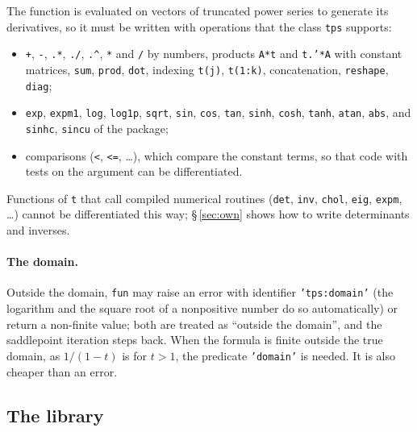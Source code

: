 \documentclass[11pt]{article}
\newcommand{\prog}[1]{\texttt{#1}}
\begin{document}
The function is evaluated on vectors of truncated power series to generate its derivatives, so it
must be written with operations that the class \prog{tps} supports:
\begin{itemize}
\item \prog{+}, \prog{-}, \prog{.*}, \prog{./}, \prog{.\^{}}, \prog{*} and \prog{/} by numbers,
products \prog{A*t} and \prog{t.'*A} with constant matrices, \prog{sum}, \prog{prod}, \prog{dot},
indexing \prog{t(j)}, \prog{t(1:k)}, concatenation, \prog{reshape}, \prog{diag};
\item \prog{exp}, \prog{expm1}, \prog{log}, \prog{log1p}, \prog{sqrt}, \prog{sin}, \prog{cos},
\prog{tan}, \prog{sinh}, \prog{cosh}, \prog{tanh}, \prog{atan}, \prog{abs}, and \prog{sinhc},
\prog{sincu} of the package;
\item comparisons (\prog{<}, \prog{<=}, \ldots), which compare the constant terms, so that code
with tests on the argument can be differentiated.
\end{itemize}
Functions of \prog{t} that call compiled numerical routines (\prog{det}, \prog{inv}, \prog{chol},
\prog{eig}, \prog{expm}, \ldots) cannot be differentiated this way; \S\,\ref{sec:own} shows how to
write determinants and inverses.

\paragraph{The domain.} Outside the domain, \prog{fun} may raise an error with identifier
\prog{'tps:domain'} (the logarithm and the square root of a nonpositive number do so
automatically) or return a non-finite value; both are treated as ``outside the domain'', and the
saddlepoint iteration steps back. When the formula is finite outside the true domain, as
$1/(1-t)$ is for $t>1$, the predicate \prog{'domain'} is needed. It is also cheaper than an error.

\subsection{The library}
\end{document}
